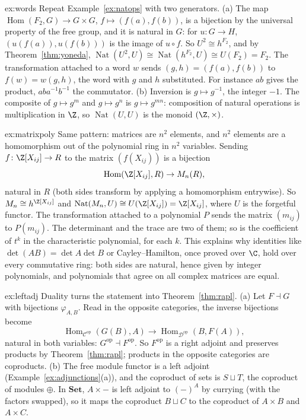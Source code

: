 \begin{solution}{ex:words}
\idea Repeat Example~\ref{ex:natops} with two generators.
\writeup (a) The map $\operatorname{Hom}(F_2,G)\to G\times G$, $f\mapsto(f(a),f(b))$, is a bijection by the universal property of the free group, and it is natural in $G$: for $u\colon G\to H$, $(u(f(a)),u(f(b)))$ is the image of $u\circ f$. So
$U^2\cong h^{F_2}$, and by Theorem~\ref{thm:yoneda}, $\operatorname{Nat}(U^2,U)\cong\operatorname{Nat}(h^{F_2},U)\cong U(F_2)=F_2$. The transformation attached to a word $w$ sends $(g,h)=(f(a),f(b))$ to $f(w)=w(g,h)$, the word with $g$ and $h$
substituted. For instance $ab$ gives the product, $aba^{-1}b^{-1}$ the commutator.
(b) Inversion is $g\mapsto g^{-1}$, the integer $-1$. The composite of $g\mapsto g^m$ and $g\mapsto g^n$ is $g\mapsto g^{mn}$: composition of natural operations is multiplication in $\Z$, so $\operatorname{Nat}(U,U)$ is the monoid $(\Z,\times)$.
\end{solution}

\begin{solution}{ex:matrixpoly}
\idea Same pattern: matrices are $n^2$ elements, and $n^2$ elements are a homomorphism out of the polynomial ring in $n^2$ variables.
\writeup Sending $f\colon\Z[X_{ij}]\to R$ to the matrix $(f(X_{ij}))$ is a bijection
\[
\operatorname{Hom}(\Z[X_{ij}],R)\to M_n(R),
\]
natural in $R$ (both sides transform by applying a homomorphism entrywise). So $M_n\cong h^{\Z[X_{ij}]}$ and
$\operatorname{Nat}(M_n,U)\cong U(\Z[X_{ij}])=\Z[X_{ij}]$, where $U$ is the forgetful functor. The transformation attached to a polynomial $P$ sends the matrix $(m_{ij})$ to $P(m_{ij})$. The determinant and the trace are two of them; so is the
coefficient of $t^k$ in the characteristic polynomial, for each $k$. This explains why identities like $\det(AB)=\det A\det B$ or Cayley--Hamilton, once proved over $\C$, hold over every commutative ring: both sides are natural, hence given by integer
polynomials, and polynomials that agree on all complex matrices are equal.
\end{solution}

\begin{solution}{ex:leftadj}
\idea Duality turns the statement into Theorem~\ref{thm:rapl}.
\writeup (a) Let $F\dashv G$ with bijections $\varphi_{A,B}$. Read in the opposite categories, the inverse bijections become
\[\operatorname{Hom}_{\mathcal C^{\mathrm{op}}}(G(B),A)\to\operatorname{Hom}_{\mathcal D^{\mathrm{op}}}(B,F(A)),\]
natural in both variables: $G^{\mathrm{op}}\dashv F^{\mathrm{op}}$. So $F^{\mathrm{op}}$ is a right adjoint and preserves products by Theorem~\ref{thm:rapl};
products in the opposite categories are coproducts. (b) The free module functor is a left adjoint (Example~\ref{ex:adjunctions}(a)), and the coproduct of sets is $S\sqcup T$, the coproduct of modules $\oplus$. In $\mathbf{Set}$, $A\times-$ is
left adjoint to $(-)^A$ by currying (with the factors swapped), so it maps the coproduct $B\sqcup C$ to the coproduct of $A\times B$ and $A\times C$.
\end{solution}

